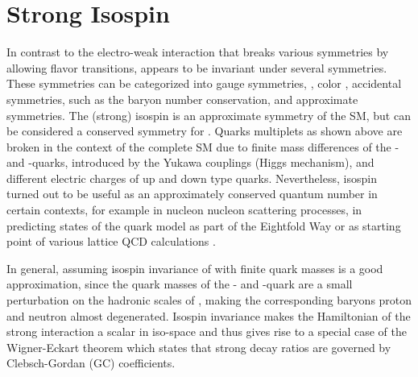 \section{Strong Isospin}
\label{sec:isospin}
In contrast to the electro-weak interaction that breaks various symmetries by allowing flavor transitions, \QCD appears to be invariant under several symmetries.
These symmetries can be categorized into gauge symmetries, \eg{}, color \grpsuthree, accidental symmetries, such as the baryon number conservation, and approximate symmetries.
The (strong) isospin is an approximate symmetry of the SM, but can be considered a conserved symmetry for \QCD.
Quarks multiplets as shown above are broken in the context of the complete SM due to finite mass differences of the \uquark- and \dquark-quarks, introduced by the Yukawa couplings (Higgs mechanism), and different electric charges of up and down type quarks.
Nevertheless, isospin turned out to be useful as an approximately conserved quantum number in certain contexts, for example in nucleon nucleon scattering processes, in predicting states of the quark model as part of the Eightfold Way or as starting point of various lattice QCD calculations \cite{NNScattering,QuarkModel,LatticeCBaryons1,LatticeCBaryons2}.

In general, assuming isospin invariance of \QCD with finite quark masses is a good approximation, since the quark masses of the \uquark- and \dquark-quark are a small perturbation on the hadronic scales of \QCD, making the corresponding baryons proton and neutron almost degenerated.
Isospin invariance makes the Hamiltonian of the strong interaction a scalar in iso-space and thus gives rise to a special case of the Wigner-Eckart theorem which states that strong decay ratios are governed by Clebsch-Gordan (GC) coefficients.

